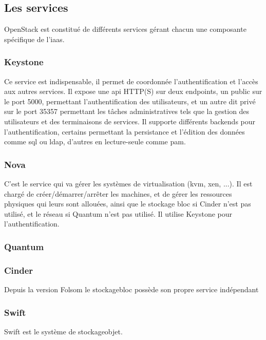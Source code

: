 \documentclass[a4paper,oneside]{report}
\begin{document}
\subsection{Les services}
OpenStack est constitué de différents services gérant chacun une composante spécifique de l'\gls{iaas}.
\subsubsection{Keystone}
Ce service est indispensable, il permet de coordonnée l'authentification et l'accès aux autres services.\newline
Il expose une \gls{api} HTTP(S) sur deux endpoints, un public sur le port 5000, permettant l'authentification des utilisateurs, et un autre dit privé sur le port 35357 permettant les tâches administratives tels que la gestion des utilisateurs et des terminaisons de services.
Il supporte différents backends pour l'authentification, certains permettant la persistance et l'édition des données comme \gls{sql} ou \gls{ldap}, d'autres en lecture-seule comme \gls{pam}.\newline

\subsubsection{Nova}
C'est le service qui va gérer les systèmes de \gls{virtualisation} (\gls{kvm}, \gls{xen}, ...).
Il est chargé de créer/démarrer/arrêter les machines, et de gérer les ressources physiques qui leurs sont allouées, ainsi que le stockage bloc si Cinder n'est pas utilisé, et le réseau si Quantum n'est pas utilisé.\newline
Il utilise Keystone pour l'authentification.


\subsubsection{Quantum}


\subsubsection{Cinder}
Depuis la version Folsom le \gls{stockagebloc} possède son propre service indépendant 



\subsubsection{Swift}
Swift est le système de \gls{stockageobjet}. 
\end{document}
